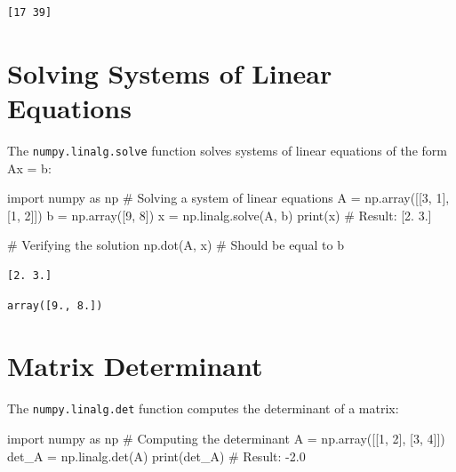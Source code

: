 \documentclass[
  english,
  letterpaper,
  DIV=11,
  numbers=noendperiod]{scrreprt}
\newenvironment{Shaded}{\begin{snugshade}}{\end{snugshade}}
\newcommand{\BuiltInTok}[1]{\textcolor[rgb]{0.00,0.23,0.31}{#1}}
\newcommand{\CommentTok}[1]{\textcolor[rgb]{0.37,0.37,0.37}{#1}}
\newcommand{\DecValTok}[1]{\textcolor[rgb]{0.68,0.00,0.00}{#1}}
\newcommand{\ImportTok}[1]{\textcolor[rgb]{0.00,0.46,0.62}{#1}}
\newcommand{\NormalTok}[1]{\textcolor[rgb]{0.00,0.23,0.31}{#1}}
\newcommand{\OperatorTok}[1]{\textcolor[rgb]{0.37,0.37,0.37}{#1}}
\begin{document}
\begin{verbatim}
[17 39]
\end{verbatim}

\section{Solving Systems of Linear
Equations}\label{solving-systems-of-linear-equations}

The \texttt{numpy.linalg.solve} function solves systems of linear
equations of the form Ax = b:

\begin{Shaded}
\begin{Highlighting}[]
\ImportTok{import}\NormalTok{ numpy }\ImportTok{as}\NormalTok{ np}
\CommentTok{\# Solving a system of linear equations}
\NormalTok{A }\OperatorTok{=}\NormalTok{ np.array([[}\DecValTok{3}\NormalTok{, }\DecValTok{1}\NormalTok{], [}\DecValTok{1}\NormalTok{, }\DecValTok{2}\NormalTok{]])}
\NormalTok{b }\OperatorTok{=}\NormalTok{ np.array([}\DecValTok{9}\NormalTok{, }\DecValTok{8}\NormalTok{])}
\NormalTok{x }\OperatorTok{=}\NormalTok{ np.linalg.solve(A, b)}
\BuiltInTok{print}\NormalTok{(x)  }\CommentTok{\# Result: [2. 3.]}

\CommentTok{\# Verifying the solution}
\NormalTok{np.dot(A, x)  }\CommentTok{\# Should be equal to b}
\end{Highlighting}
\end{Shaded}

\begin{verbatim}
[2. 3.]
\end{verbatim}

\begin{verbatim}
array([9., 8.])
\end{verbatim}

\section{Matrix Determinant}\label{matrix-determinant}

The \texttt{numpy.linalg.det} function computes the determinant of a
matrix:

\begin{Shaded}
\begin{Highlighting}[]
\ImportTok{import}\NormalTok{ numpy }\ImportTok{as}\NormalTok{ np}
\CommentTok{\# Computing the determinant}
\NormalTok{A }\OperatorTok{=}\NormalTok{ np.array([[}\DecValTok{1}\NormalTok{, }\DecValTok{2}\NormalTok{], [}\DecValTok{3}\NormalTok{, }\DecValTok{4}\NormalTok{]])}
\NormalTok{det\_A }\OperatorTok{=}\NormalTok{ np.linalg.det(A)}
\BuiltInTok{print}\NormalTok{(det\_A)  }\CommentTok{\# Result: {-}2.0}
\end{Highlighting}
\end{Shaded}
\end{document}

